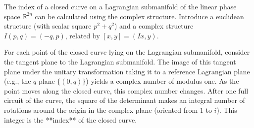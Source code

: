 The index of a closed curve on a Lagrangian submanifold of the linear phase space $\mathbb{R}^{2n}$ can be calculated using the complex structure. Introduce a euclidean structure (with scalar square $p^2 + q^2$) and a complex structure $I(p,q) = (-q,p)$, related by $[x,y] = (Ix, y)$.

For each point of the closed curve lying on the Lagrangian submanifold, consider the tangent plane to the Lagrangian submanifold. The image of this tangent plane under the unitary transformation taking it to a reference Lagrangian plane (e.g., the $q$-plane $\{(0,q)\}$) yields a complex number of modulus one. As the point moves along the closed curve, this complex number changes. After one full circuit of the curve, the square of the determinant makes an integral number of rotations around the origin in the complex plane (oriented from $1$ to $i$). This integer is the **index** of the closed curve.
